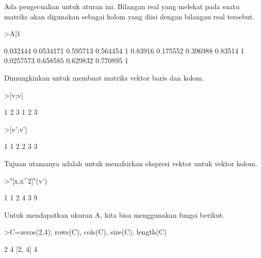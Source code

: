\begin{eulernotebook}
\begin{eulercomment}
\begin{eulercomment}
\begin{eulercomment}
Ada pengecualian untuk aturan ini. Bilangan real yang melekat pada
suatu matriks akan digunakan sebagai kolom yang diisi dengan bilangan
real tersebut.
\end{eulercomment}
\begin{eulerprompt}
>A|1
\end{eulerprompt}
\begin{euleroutput}
       0.032444     0.0534171      0.595713      0.564454             1 
        0.83916      0.175552      0.396988       0.83514             1 
      0.0257573      0.658585      0.629832      0.770895             1 
\end{euleroutput}
\begin{eulercomment}
Dimungkinkan untuk membuat matriks vektor baris dan kolom.
\end{eulercomment}
\begin{eulerprompt}
>[v;v]
\end{eulerprompt}
\begin{euleroutput}
              1             2             3 
              1             2             3 
\end{euleroutput}
\begin{eulerprompt}
>[v',v']
\end{eulerprompt}
\begin{euleroutput}
              1             1 
              2             2 
              3             3 
\end{euleroutput}
\begin{eulercomment}
Tujuan utamanya adalah untuk menafsirkan ekspresi vektor untuk vektor
kolom.
\end{eulercomment}
\begin{eulerprompt}
>"[x,x^2]"(v')
\end{eulerprompt}
\begin{euleroutput}
              1             1 
              2             4 
              3             9 
\end{euleroutput}
\begin{eulercomment}
Untuk mendapatkan ukuran A, kita bisa menggunakan fungsi berikut.
\end{eulercomment}
\begin{eulerprompt}
>C=zeros(2,4); rows(C), cols(C), size(C), length(C)
\end{eulerprompt}
\begin{euleroutput}
  2
  4
  [2,  4]
  4
\end{euleroutput}
\begin{eulercomment}

\end{eulercomment}
\end{eulercomment}
\end{eulercomment}
\end{eulernotebook}
